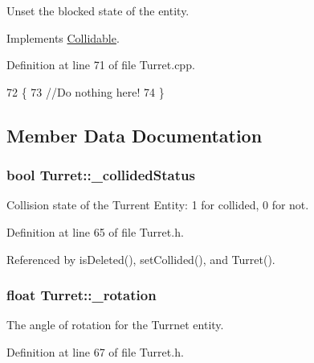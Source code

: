 Unset the blocked state of the entity. 



Implements \hyperlink{classCollidable_a817d864d0640bc6bcb13bbecf14ddf31}{Collidable}.



Definition at line 71 of file Turret.\-cpp.


\begin{DoxyCode}
72 \{
73     \textcolor{comment}{//Do nothing here!}
74 \}
\end{DoxyCode}


\subsection{Member Data Documentation}
\hypertarget{classTurret_aceb63c533fdc7b332addf9de88336c9c}{
\subsubsection[{\-\_\-collided\-Status}]{\setlength{\rightskip}{0pt plus 5cm}bool Turret\-::\-\_\-collided\-Status\hspace{0.3cm}{\ttfamily [private]}}}\label{classTurret_aceb63c533fdc7b332addf9de88336c9c}


Collision state of the Turrent Entity\-: 1 for collided, 0 for not. 



Definition at line 65 of file Turret.\-h.



Referenced by is\-Deleted(), set\-Collided(), and Turret().

\hypertarget{classTurret_a5570f2cbe1ac6bd008a9fa3b79998756}{
\subsubsection[{\-\_\-rotation}]{\setlength{\rightskip}{0pt plus 5cm}float Turret\-::\-\_\-rotation\hspace{0.3cm}{\ttfamily [private]}}}\label{classTurret_a5570f2cbe1ac6bd008a9fa3b79998756}


The angle of rotation for the Turrnet entity. 



Definition at line 67 of file Turret.\-h.

